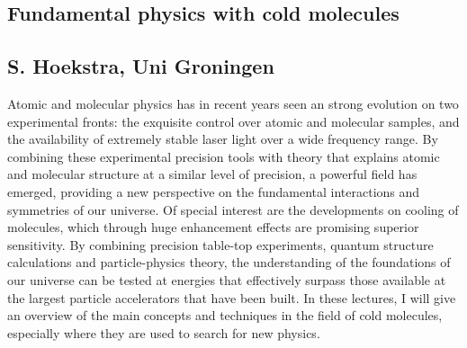 \subsection*{Fundamental physics with cold molecules}
\subsection*{S. Hoekstra, Uni Groningen}
\noindent Atomic and molecular physics has in recent years seen an strong evolution on two experimental fronts: the exquisite control over atomic and molecular samples, and the availability of extremely stable laser light over a wide frequency range. By combining these experimental precision tools with theory that explains atomic and molecular structure at a similar level of precision, a powerful field has emerged, providing a new perspective on the fundamental interactions and symmetries of our universe. Of special interest are the developments on cooling of molecules, which through huge enhancement effects are promising superior sensitivity. By combining precision table-top experiments, quantum structure calculations and particle-physics theory, the understanding of the foundations of our universe can be tested at energies that effectively surpass those available at the largest particle accelerators that have been built. In these lectures, I will give an overview of the main concepts and techniques in the field of cold molecules, especially where they are used to search for new physics.
